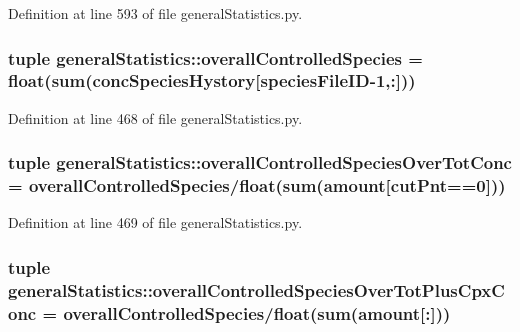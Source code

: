 \-Definition at line 593 of file general\-Statistics.\-py.

\hypertarget{namespacegeneral_statistics_a329d09d383e53e22ade6723b35e103d8}{
\subsubsection[{overall\-Controlled\-Species}]{\setlength{\rightskip}{0pt plus 5cm}tuple {\bf general\-Statistics\-::overall\-Controlled\-Species} = float({\bf sum}({\bf conc\-Species\-Hystory}\mbox{[}{\bf species\-File\-I\-D}-\/1,\-:\mbox{]}))}}\label{namespacegeneral_statistics_a329d09d383e53e22ade6723b35e103d8}


\-Definition at line 468 of file general\-Statistics.\-py.

\hypertarget{namespacegeneral_statistics_a1aa6e06b015adb6e6c1462d23ac27fdc}{
\subsubsection[{overall\-Controlled\-Species\-Over\-Tot\-Conc}]{\setlength{\rightskip}{0pt plus 5cm}tuple {\bf general\-Statistics\-::overall\-Controlled\-Species\-Over\-Tot\-Conc} = {\bf overall\-Controlled\-Species}/float({\bf sum}(amount\mbox{[}cut\-Pnt==0\mbox{]}))}}\label{namespacegeneral_statistics_a1aa6e06b015adb6e6c1462d23ac27fdc}


\-Definition at line 469 of file general\-Statistics.\-py.

\hypertarget{namespacegeneral_statistics_ae4d5f219fa4de0de3ad4968fd52b4e61}{
\subsubsection[{overall\-Controlled\-Species\-Over\-Tot\-Plus\-Cpx\-Conc}]{\setlength{\rightskip}{0pt plus 5cm}tuple {\bf general\-Statistics\-::overall\-Controlled\-Species\-Over\-Tot\-Plus\-Cpx\-Conc} = {\bf overall\-Controlled\-Species}/float({\bf sum}(amount\mbox{[}\-:\mbox{]}))}}\label{namespacegeneral_statistics_ae4d5f219fa4de0de3ad4968fd52b4e61}


